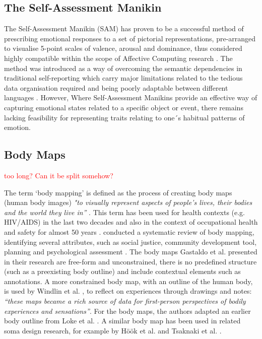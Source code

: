 \subsection{The Self-Assessment Manikin}

The Self-Assessment Manikin (SAM) has proven to be a successful method of prescribing emotional responses to a set of pictorial representations, pre-arranged to visualise 5-point scales of valence, arousal and dominance, thus considered highly compatible within the scope of Affective Computing research \cite{broekens_affectbutton_2013,zeigler-hill_self-assessment_2017}. The method was introduced as a way of overcoming the semantic dependencies in traditional self-reporting which carry major limitations related to the tedious data organisation required and being poorly adaptable between different languages \cite{zeigler-hill_self-assessment_2017}. However, Where Self-Assessment Manikins provide an effective way of capturing emotional states related to a specific object or event, there remains lacking feasibility for representing traits relating to one´s habitual patterns of emotion.

\subsection{Body Maps}
\textcolor{red}{too long? Can it be split somehow?}

The term ‘body mapping’ is defined as the process of creating body maps (human body images) \textit{"to visually represent aspects of people's lives, their bodies and the world they live in”} \cite{gastaldo_body-map_2012}. This term has been used for health contexts (e.g. HIV/AIDS) in the last two decades and also in the context of occupational health and safety for almost 50 years \cite{gastaldo_body-map_2012}. \citeauthor{de_jager_embodied_2016} conducted a systematic review of body mapping, identifying several attributes, such as social justice, community development tool, planning and psychological assessment \cite{de_jager_embodied_2016}. The body maps Gastaldo et al. presented in their research are free-form and unconstrained, there is no predefined structure (such as a preexisting body outline) and include contextual elements such as annotations. A more constrained body map, with an outline of the human body, is used by Windlin et al. \cite{windlin_soma_2019}, to reflect on experiences through drawings and notes: \textit{“these maps became a rich source of data for first-person perspectives of bodily experiences and sensations”}. For the body maps, the authors adapted an earlier body outline from Loke et al. \cite{loke_bodily_2012}. A similar body map has been used in related soma design research, for example by Höök et al. \cite{hook_soma_2019} and Tsaknaki et al. \cite{tsaknaki_teaching_2019}.

